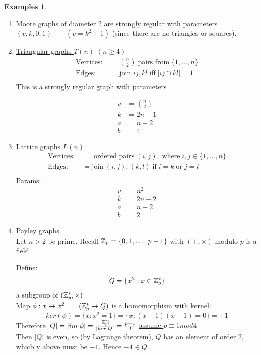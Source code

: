 \documentclass[]{article}
\theoremstyle{definition}
\newtheorem*{exmps}{Examples}
\theoremstyle{remark}
\numberwithin{equation}{section}
\begin{document}
	\begin{exmps}
		\begin{enumerate}
			\item Moore graphs of diameter 2 are strongly regular with parameters $(v,k, 0,1)\qquad (v=k^2+1)$ (since there are no triangles or squares). %
			\item \underline{Triangular graphs $T(n)$} $(n\geq 4)$\\
			\begin{align*}
				\text{Vertices:}\; &= \binom{n}{2}\; \text{pairs from}\; \{1,\hdots, n\}\\
				\text{Edges:}\; &= \text{join}\; ij, kl\; \text{iff}\; |ij \cap kl| = 1\\
			\end{align*}
			This is a strongly regular graph with parameters

			\begin{align*}
				v &= \binom{n}{2}\\
				k &= 2n -1\\
				a &= n-2\\
				b &= 4
			\end{align*}
			\item \underline{Lattice graphs $L(n)$}
			\begin{align*}
				\text{Vertices:}\; &=\;\text{ordered pairs}\; (i,j),\; \text{where}\; i,j \in \{1,\hdots,n\}\\
				\text{Edges:}\; &= \text{join}\; (i,j), (k,l)\;\text{if}\; i=k\;\text{or}\; j=l\\
			\end{align*}
			Params:
			\begin{align*}
				v &= n^2\\
				k &= 2n -2\\
				a &= n-2\\
				b &= 2
			\end{align*}
			\item \underline{Payley graphs}\\
			Let $n>2$ be prime. Recall $\mathbb{Z}_p = \{0,1,\hdots, p-1\}$ with $(+,\times)$ modulo $p$ is a \underline{field}.
			\par{Define:}\\
				\[Q= \{x^2:x \in \mathbb{Z}_p^{*}\}\]
				a subgroup of $(\mathbb{Z}_p^{*}, \times)$\\
				Map $\phi: x \rightarrow x^2 \qquad (\mathbb{Z}_p^* \rightarrow Q)$ is a homomorphism with kernel:
				\[
					ker(\phi) = \{x: x^2=1\} = \{x: (x-1)(x+1) = 0\} = \pm 1
				\]
				Therefore $|Q| = |im\;\phi| = \frac{|\mathbb{Z}_p^*|}{|ker\;Q|} = \frac{p-1}{2}$
			\underline{assume $p\equiv 1 mod 4$}\\
			Then $|Q|$ is even, so (by Lagrange theorem), $Q$ has an element of order 2, whicb y above must be $-1$. Hence $-1 \in Q$.


\end{enumerate}
\end{exmps}
\end{document}
